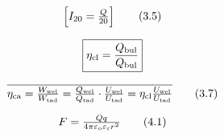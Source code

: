 \documentclass{article}
\begin{document}
\[
$$
\left[ I_{2 0}=\frac{Q} {2 0} \right] \tag{3.5}
$$
\]

\[
$$
\boxed{\eta_{\mathrm{c l}}=\frac{Q_{\mathrm{b u l}}} {Q_{\mathrm{b u l}}}}
$$
\]

\[
$$
\overline{{\eta_{\mathrm{c a}}=\frac{W_{\mathrm{w e l}}} {W_{\mathrm{t a d}}}=\frac{Q_{\mathrm{w e l}}} {Q_{\mathrm{t a d}}} \cdot\frac{U_{\mathrm{w e l}}} {U_{\mathrm{t a d}}}=\eta_{\mathrm{c l}} \frac{U_{\mathrm{w e l}}} {U_{\mathrm{t a d}}}}} \tag{3.7}
$$
\]

\[
$$
F=\frac{Q q} {4 \pi\varepsilon_{\mathrm{o}} \varepsilon_{\mathrm{r}} r^{2}} \tag{4.1}
$$
\]
\end{document}

